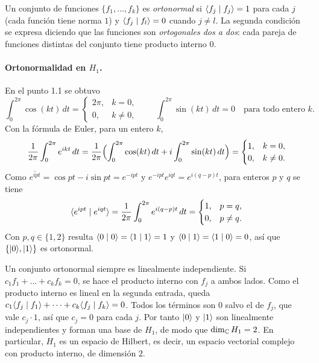 \begin{definicionT}
Un conjunto de funciones $\{f_1,\dots,f_k\}$ es \emph{ortonormal} si $\langle f_j\mid f_j\rangle=1$ para cada $j$ (cada función tiene norma $1$) y $\langle f_j\mid f_l\rangle=0$ cuando $j\neq l$. La segunda condición se expresa diciendo que las funciones son \emph{ortogonales dos a dos}: cada pareja de funciones distintas del conjunto tiene producto interno $0$.
\end{definicionT}

\paragraph{Ortonormalidad en $H_1$.} En el punto 1.1 se obtuvo
\[
  \int_0^{2\pi}\cos(kt)\,dt=\begin{cases}2\pi,&k=0,\\0,&k\neq0,\end{cases}\qquad
  \int_0^{2\pi}\sin(kt)\,dt=0\quad\text{para todo entero }k .
\]
Con la fórmula de Euler, para un entero $k$,
\[
  \frac1{2\pi}\int_0^{2\pi}e^{ikt}\,dt=\frac1{2\pi}\Bigl(\int_0^{2\pi}\cos(kt)\,dt+i\int_0^{2\pi}\sin(kt)\,dt\Bigr)=\begin{cases}1,&k=0,\\0,&k\neq0.\end{cases}
\]
Como $\overline{e^{ipt}}=\cos pt-i\sin pt=e^{-ipt}$ y $e^{-ipt}e^{iqt}=e^{i(q-p)t}$, para enteros $p$ y $q$ se tiene
\[
  \langle e^{ipt}\mid e^{iqt}\rangle=\frac1{2\pi}\int_0^{2\pi}e^{i(q-p)t}\,dt=\begin{cases}1,&p=q,\\0,&p\neq q.\end{cases}
\]
Con $p,q\in\{1,2\}$ resulta $\langle 0\mid 0\rangle=\langle 1\mid 1\rangle=1$ y $\langle 0\mid 1\rangle=\langle 1\mid 0\rangle=0$, así que $\{\lvert 0\rangle,\lvert 1\rangle\}$ es ortonormal.

Un conjunto ortonormal siempre es linealmente independiente. Si $c_1f_1+\dots+c_kf_k=0$, se hace el producto interno con $f_j$ a ambos lados. Como el producto interno es lineal en la segunda entrada, queda $c_1\langle f_j\mid f_1\rangle+\dots+c_k\langle f_j\mid f_k\rangle=0$. Todos los términos son $0$ salvo el de $f_j$, que vale $c_j\cdot1$, así que $c_j=0$ para cada $j$. Por tanto $\lvert 0\rangle$ y $\lvert 1\rangle$ son linealmente independientes y forman una base de $H_1$, de modo que $\dim_{\mathbb{C}}H_1=2$. En particular, $H_1$ es un espacio de Hilbert, es decir, un espacio vectorial complejo con producto interno, de dimensión $2$.


